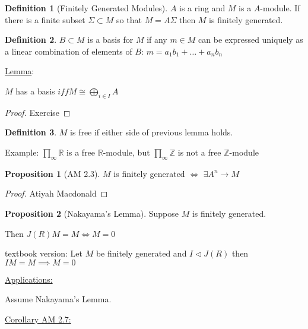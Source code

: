 \documentclass{article}
\theoremstyle{definition}
\newtheorem{definition}{Definition}
\newtheorem{proposition}{Proposition}
\begin{document}
\begin{definition}
    [Finitely Generated Modules]

    \(A\) is a ring and \(M\) is a \(A\)-module. If there is a finite subset \(\Sigma \subset M\) so that \(M = A \Sigma\) then \(M\) is finitely generated.

\end{definition}

\begin{definition}
    \(B \subset M\) is a basis for \(M\) if any \(m\in M\) can be expressed uniquely as a linear combination of elements of \(B\): \(m = a_1 b_1 + \dots + a_n b_n\) 
\end{definition}

\underline{Lemma}:

\(M\) has a basis \(iff M \cong \bigoplus_{i\in I}^{} A\) 

\begin{proof}
    Exercise
\end{proof}

\begin{definition}
    \(M\) is free if either side of previous lemma holds.
\end{definition}

Example: \(\prod_\infty \mathbb{R}\) is a free \(\mathbb{R}\)-module, but \(\prod_\infty \mathbb{Z}\) is not a free \(\mathbb{Z}\)-module 

\begin{proposition}
    [AM 2.3]

    \(M\) is finitely generated \(\iff\) \(\exists A^n \to M\) 
\end{proposition}

\begin{proof}
    Atiyah Macdonald
\end{proof}

\begin{proposition}
    [Nakayama's Lemma]

    Suppose \(M\) is finitely generated.
    
    Then \(J(R)M = M \iff M = 0\) 

    textbook version: Let \(M\) be finitely generated and \(I \triangleleft J(R)\) then \(IM = M \implies M = 0\) 
\end{proposition}

\underline{Applications:}

Assume Nakayama's Lemma.

\underline{Corollary AM 2.7:}
\end{document}
